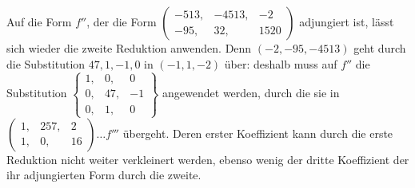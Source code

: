 Auf die Form \(f''\), der die Form \(\left(\begin{smallmatrix}-513,&-4513,&-2\\-95,&32,&1520\end{smallmatrix}\right)\) adjungiert ist, lässt sich wieder die zweite Reduktion anwenden. Denn \((-2,-95,-4513)\) geht durch die Substitution \(47,1,-1,0\) in \((-1,1,-2)\) über: deshalb muss auf \(f''\) die Substitution \(\left\{\begin{smallmatrix}1,&0,&0\\0,&47,&-1\\0,&1,&0\end{smallmatrix}\right\}\) angewendet werden, durch die sie in \(\left(\begin{smallmatrix}1,&257,&2\\1,&0,&16\end{smallmatrix}\right)\ldots f'''\) übergeht. Deren erster Koeffizient kann durch die erste Reduktion nicht weiter verkleinert werden, ebenso wenig der dritte Koeffizient der ihr adjungierten Form durch die zweite.

